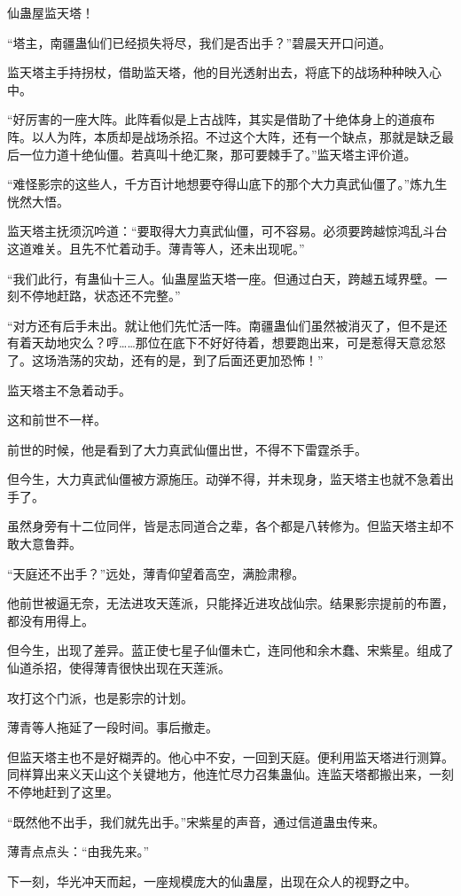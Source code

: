 \begin{this_body}
仙蛊屋监天塔！

“塔主，南疆蛊仙们已经损失将尽，我们是否出手？”碧晨天开口问道。

监天塔主手持拐杖，借助监天塔，他的目光透射出去，将底下的战场种种映入心中。

“好厉害的一座大阵。此阵看似是上古战阵，其实是借助了十绝体身上的道痕布阵。以人为阵，本质却是战场杀招。不过这个大阵，还有一个缺点，那就是缺乏最后一位力道十绝仙僵。若真叫十绝汇聚，那可要棘手了。”监天塔主评价道。

“难怪影宗的这些人，千方百计地想要夺得山底下的那个大力真武仙僵了。”炼九生恍然大悟。

监天塔主抚须沉吟道：“要取得大力真武仙僵，可不容易。必须要跨越惊鸿乱斗台这道难关。且先不忙着动手。薄青等人，还未出现呢。”

“我们此行，有蛊仙十三人。仙蛊屋监天塔一座。但通过白天，跨越五域界壁。一刻不停地赶路，状态还不完整。”

“对方还有后手未出。就让他们先忙活一阵。南疆蛊仙们虽然被消灭了，但不是还有着天劫地灾么？哼……那位在底下不好好待着，想要跑出来，可是惹得天意忿怒了。这场浩荡的灾劫，还有的是，到了后面还更加恐怖！”

监天塔主不急着动手。

这和前世不一样。

前世的时候，他是看到了大力真武仙僵出世，不得不下雷霆杀手。

但今生，大力真武仙僵被方源施压。动弹不得，并未现身，监天塔主也就不急着出手了。

虽然身旁有十二位同伴，皆是志同道合之辈，各个都是八转修为。但监天塔主却不敢大意鲁莽。

“天庭还不出手？”远处，薄青仰望着高空，满脸肃穆。

他前世被逼无奈，无法进攻天莲派，只能择近进攻战仙宗。结果影宗提前的布置，都没有用得上。

但今生，出现了差异。蓝正使七星子仙僵未亡，连同他和余木蠢、宋紫星。组成了仙道杀招，使得薄青很快出现在天莲派。

攻打这个门派，也是影宗的计划。

薄青等人拖延了一段时间。事后撤走。

但监天塔主也不是好糊弄的。他心中不安，一回到天庭。便利用监天塔进行测算。同样算出来义天山这个关键地方，他连忙尽力召集蛊仙。连监天塔都搬出来，一刻不停地赶到了这里。

“既然他不出手，我们就先出手。”宋紫星的声音，通过信道蛊虫传来。

薄青点点头：“由我先来。”

下一刻，华光冲天而起，一座规模庞大的仙蛊屋，出现在众人的视野之中。


\end{this_body}
